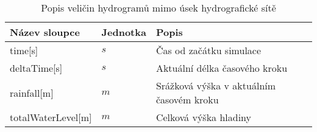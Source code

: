 
\begin{table}[t]
 

 \centering
 \caption{Popis veličin hydrogramů mimo úsek hydrografické sítě}
\label{tab:vystupydat}

 \begin{tabular}{llp{}}
  \hline  \hline
 Název sloupce    & Jednotka    & Popis       \\ 
  \hline
 time[s]          &   $s$      &  Čas od začátku simulace          \\
 deltaTime[s]     &   $s$        &  Aktuální délka časového kroku  \\
 rainfall[m]      &  $m$         &  Srážková výška v aktuálním časovém kroku \\
 totalWaterLevel[m]	  &   $m$	&  Celková výška hladiny  \\ 

\end{tabular}
\end{table}
